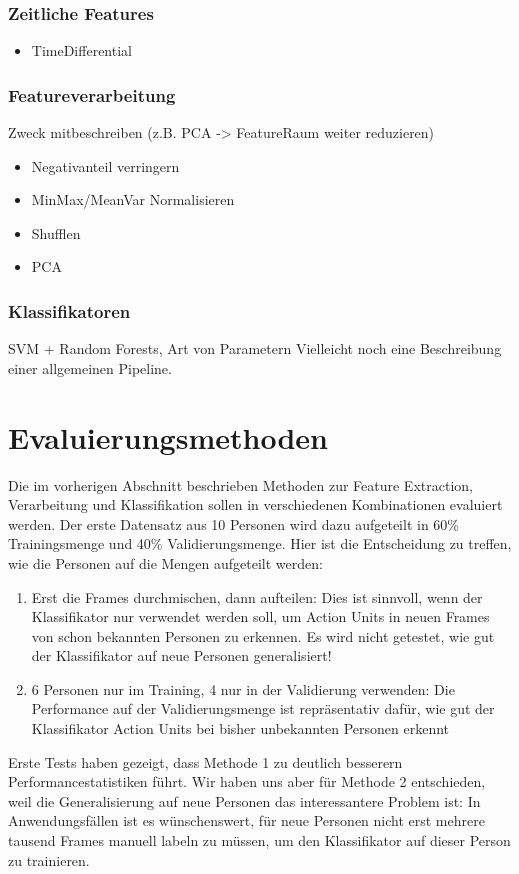 \subsubsection{Zeitliche Features}
\begin{itemize}
\item TimeDifferential
\end{itemize}


\subsubsection{Featureverarbeitung}
Zweck mitbeschreiben (z.B. PCA -> FeatureRaum weiter reduzieren)
\begin{itemize}
  \item Negativanteil verringern
  \item MinMax/MeanVar Normalisieren
  \item Shufflen
  \item PCA
\end{itemize}

\subsubsection{Klassifikatoren}
SVM + Random Forests, Art von Parametern
Vielleicht noch eine Beschreibung einer allgemeinen Pipeline.


\section{Evaluierungsmethoden}
Die im vorherigen Abschnitt beschrieben Methoden zur Feature Extraction,
Verarbeitung und Klassifikation sollen in verschiedenen Kombinationen evaluiert
werden. Der erste Datensatz aus 10 Personen wird dazu aufgeteilt in 60\%
Trainingsmenge und 40\% Validierungsmenge. Hier ist die Entscheidung zu treffen,
wie die Personen auf die Mengen aufgeteilt werden:
\begin{enumerate}
\item Erst die Frames durchmischen, dann aufteilen: Dies ist sinnvoll, wenn der
  Klassifikator nur verwendet werden soll, um Action Units in neuen Frames von schon bekannten
  Personen zu erkennen. Es wird nicht getestet, wie gut der Klassifikator auf
  neue Personen generalisiert!
  \item 6 Personen nur im Training, 4 nur in der Validierung verwenden: Die
    Performance auf der Validierungsmenge ist repräsentativ dafür, wie gut der
    Klassifikator Action Units bei bisher unbekannten Personen erkennt
\end{enumerate}
Erste Tests haben gezeigt, dass Methode 1 zu deutlich besserern
Performancestatistiken führt. Wir haben uns aber für Methode 2 entschieden, weil
die Generalisierung auf neue Personen das interessantere Problem ist: In
Anwendungsfällen ist es wünschenswert, für neue Personen nicht erst mehrere
tausend Frames manuell labeln zu müssen, um den Klassifikator auf dieser Person
zu trainieren.

